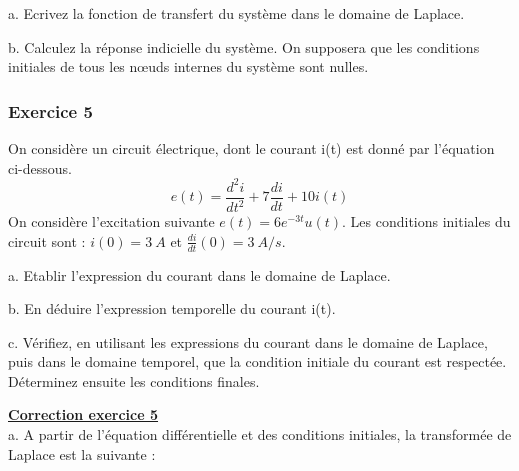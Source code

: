 \documentclass[11pt]{report}
\begin{document}
	a. Ecrivez la fonction de transfert du système dans le domaine de Laplace.
	
	b. Calculez la réponse indicielle du système. On supposera que les conditions initiales de tous les nœuds internes du système sont nulles. 
	
	
	\vspace{1\baselineskip}
	
		
	\subsubsection{Exercice 5}
	
	On considère un circuit électrique, dont le courant i(t) est donné par l'équation ci-dessous.
	\begin{equation*}
		e(t)=\frac{d^{2}i}{dt^{2}}+7\frac{di}{dt}+10i(t)
	\end{equation*}
	On considère l'excitation suivante $e(t)=6e^{-3t}u(t)$. Les conditions initiales du circuit sont : $i(0) = 3~A$ et $\frac{di}{dt}(0)=3~A/s$.
	
	
	a. Etablir l'expression du courant dans le domaine de Laplace.
	
	b. En déduire l'expression temporelle du courant i(t).
	
	c. Vérifiez, en utilisant les expressions du courant dans le domaine de Laplace, puis dans le domaine temporel, que la condition initiale du courant est respectée. Déterminez ensuite les conditions finales.
	
	\vspace{1\baselineskip}
	
	\textbf{\underline{Correction exercice 5}}\\
	a. A partir de l'équation différentielle et des conditions initiales, la transformée de Laplace est la suivante :
	
\end{document}
